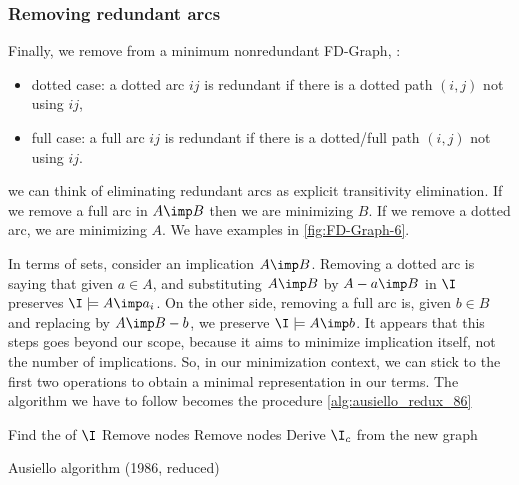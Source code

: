\subsubsection{Removing redundant arcs}

Finally, we remove from a minimum nonredundant FD-Graph, :
\begin{itemize}
	\item dotted case: a dotted arc $ij$ is redundant if there is a dotted 
	path $(i, j)$ not using $ij$,
	\item full case: a full arc $ij$ is redundant if there is a dotted/full 
	path $(i, j)$ not using $ij$.
\end{itemize}

\noindent we can think of eliminating redundant arcs as explicit transitivity
elimination. If we remove a full arc in $A \imp B$ then we are minimizing $B$.
If we remove a dotted arc, we are minimizing $A$. We have examples in 
\ref{fig:FD-Graph-6}. 



In terms of sets, consider an implication $A \imp B$. Removing a dotted arc is
saying that given $a \in A$, and substituting $A \imp B$ by $A - a \imp B$ in
$\I$ preserves $\I \models A \imp a_i$. On the other side, removing a full arc
is, given $b \in B$ and replacing by $A \imp B - b$, we preserve $\I \models 
A \imp b$. It appears that this steps goes beyond our scope, because it aims
to minimize implication itself, not the number of implications. So, in our 
minimization context, we can stick to the first two operations to obtain a 
minimal representation in our terms. The algorithm we have to follow becomes
the procedure \ref{alg:ausiello_redux_86}

\vspace{1.2em}

\begin{algorithm}[H]
	
	\BlankLine
	\BlankLine
	
	Find the  of $\I$ \;
	Remove  nodes \;
	Remove  nodes \;
	Derive $\I_c$ from the new graph \;
	
	\caption{Ausiello algorithm (1986, reduced)}
	\label{alg:ausiello_redux_86}
\end{algorithm}

\vspace{1.2em}

